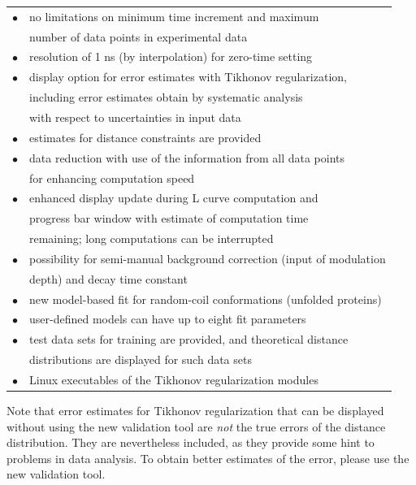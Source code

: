 \documentclass{article}
\begin{document}
\begin{tabular}{ll}
\noalign{\smallskip}
$\bullet$ & no limitations on minimum time increment and maximum \\ & number of data points in experimental data\\
$\bullet$ & resolution of 1 ns (by interpolation) for zero-time setting \\
$\bullet$ & display option for error estimates with Tikhonov regularization, \\ & including error estimates obtain by systematic analysis \\ & with respect to uncertainties in input data \\
$\bullet$ & estimates for distance constraints are provided\\
$\bullet$ & data reduction with use of the information from all data points\\ & for enhancing computation speed\\
$\bullet$ & enhanced display update during L curve computation and \\ & progress bar window with estimate of computation time \\ & remaining; long computations can be interrupted\\
$\bullet$ & possibility for semi-manual background correction (input of modulation \\ & depth) and decay time constant\\
$\bullet$ & new model-based fit for random-coil conformations (unfolded proteins)\\
$\bullet$ & user-defined models can have up to eight fit parameters\\
$\bullet$ & test data sets for training are provided, and theoretical distance\\ & distributions are displayed for such data sets\\
$\bullet$ & Linux executables of the Tikhonov regularization modules\\
\end{tabular}

\vspace{10pt}

Note that error estimates for Tikhonov regularization that can be displayed without using the new validation tool are \emph{not} the true errors of the distance distribution. They are nevertheless included, as they provide some hint to problems in data analysis. To obtain better estimates of the error, please use the new validation tool.
\end{document}
